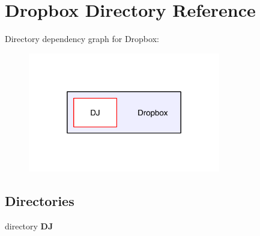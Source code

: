 \section{Dropbox Directory Reference}
\label{dir_e2c88a9c3d830e594a88bfb657bfbe66}
Directory dependency graph for Dropbox\-:\nopagebreak
\begin{figure}[H]
\begin{center}
\leavevmode
\includegraphics[width=238pt]{dir_e2c88a9c3d830e594a88bfb657bfbe66_dep}
\end{center}
\end{figure}
\subsection*{Directories}
\begin{DoxyCompactItemize}
\item 
directory {\bf D\-J}
\end{DoxyCompactItemize}
